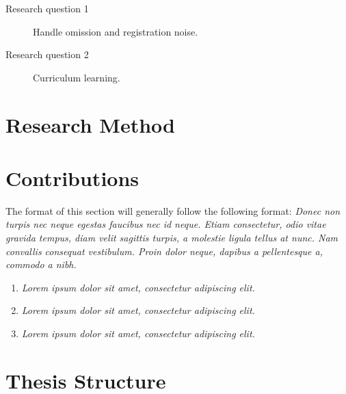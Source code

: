 \documentclass[a4paper]{book}
\begin{document}
\begin{description}
\item[Research question 1] Handle omission and registration noise.
\end{description}


\begin{description}
\item[Research question 2]  Curriculum learning.
\end{description}


\section{Research Method}
\label{sec:researchMethod}



\section{Contributions}
\label{sec:IntroContributions}

The format of this section will generally follow the following format:
{\it
Donec non turpis nec neque egestas faucibus nec id neque. Etiam consectetur, odio vitae gravida tempus, diam velit sagittis turpis, a molestie ligula tellus at nunc. Nam convallis consequat vestibulum. Proin dolor neque, dapibus a pellentesque a, commodo a nibh.}

\begin{enumerate}
\item {\it Lorem ipsum dolor sit amet, consectetur adipiscing elit.}
\item {\it Lorem ipsum dolor sit amet, consectetur adipiscing elit.}
\item {\it Lorem ipsum dolor sit amet, consectetur adipiscing elit.}
\end{enumerate}


\section{Thesis Structure}
\label{sec:thesisStructure}
\end{document}

